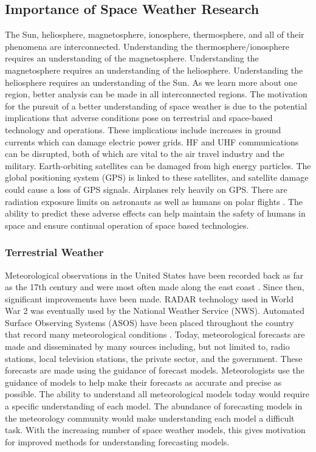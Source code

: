 \subsection{Importance of Space Weather Research}
The Sun, heliosphere, magnetosphere, ionosphere, thermosphere, and all of their
phenomena are interconnected.
Understanding the thermosphere/ionosphere requires an understanding of the
magnetosphere. Understanding the magnetosphere requires an understanding of the
heliosphere. Understanding the heliosphere requires an understanding of the Sun.
As we learn more about one region, better analysis can be made in all
interconnected regions. The motivation for the pursuit of a better understanding
of space weather is due to the potential implications that adverse conditions
pose on terrestrial and space-based technology and operations.
These implications include increases in ground currents which can damage
electric power grids. HF and UHF communications can be disrupted, both of which
are vital to the air travel industry and the military. Earth-orbiting satellites
can be damaged from high energy particles. The global positioning system (GPS)
is linked to these satellites, and satellite damage could cause a loss of GPS
signals. Airplanes rely heavily on GPS. There are radiation exposure limits on astronauts
as well as humans on polar flights \citep{Pirjola2005}. The ability to
predict these adverse effects can help maintain the safety of humans in space
and ensure continual operation of space based technologies.

\subsubsection{Terrestrial Weather}
Meteorological observations in the United States have been recorded back as far
as the 17th century and were most often made along the east coast
\citep{Fiebrich2009}. Since then, significant improvements have been made. RADAR
technology used in World War 2 \citep{Page} was eventually used by the National
Weather Service (NWS). Automated Surface Observing Systems (ASOS) have been
placed throughout the country that record many meteorological conditions
\citep{Ahrens}. Today, meteorological forecasts are made and disseminated by
many sources including, but not limited to, radio stations, local television stations, the
private sector, and the government. These forecasts are made using the guidance
of forecast models. Meteorologists use the guidance of models to help make their
forecasts as accurate and precise as possible. The ability to understand all
meteorological models today would require a specific understanding of each
model. The abundance of forecasting models in the meteorology community would
make understanding each model a difficult task. With the increasing number of space weather
models, this gives motivation for improved methods for understanding forecasting
models.
